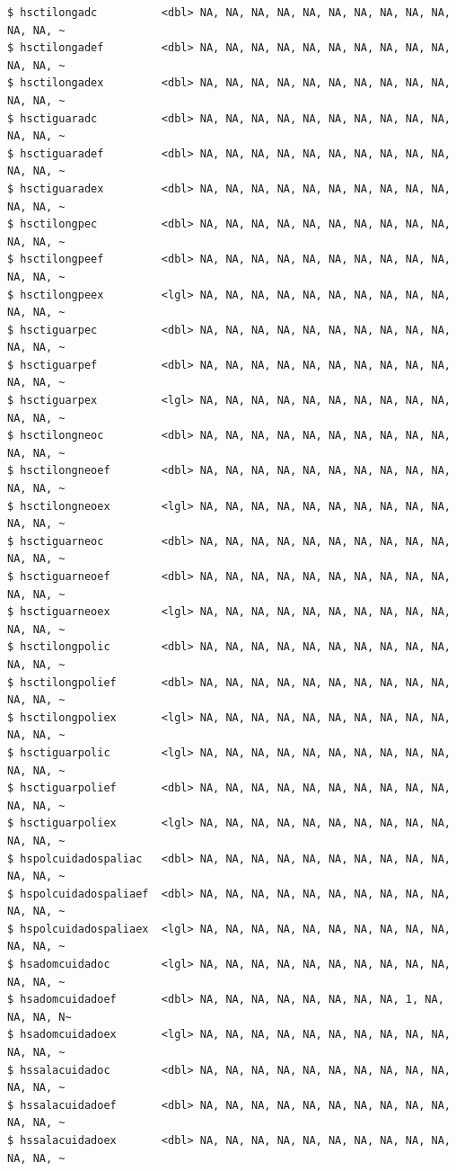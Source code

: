 \documentclass[
  letterpaper,
  DIV=11,
  numbers=noendperiod]{scrreprt}
\begin{document}
\begin{verbatim}
$ hsctilongadc          <dbl> NA, NA, NA, NA, NA, NA, NA, NA, NA, NA, NA, NA, ~
$ hsctilongadef         <dbl> NA, NA, NA, NA, NA, NA, NA, NA, NA, NA, NA, NA, ~
$ hsctilongadex         <dbl> NA, NA, NA, NA, NA, NA, NA, NA, NA, NA, NA, NA, ~
$ hsctiguaradc          <dbl> NA, NA, NA, NA, NA, NA, NA, NA, NA, NA, NA, NA, ~
$ hsctiguaradef         <dbl> NA, NA, NA, NA, NA, NA, NA, NA, NA, NA, NA, NA, ~
$ hsctiguaradex         <dbl> NA, NA, NA, NA, NA, NA, NA, NA, NA, NA, NA, NA, ~
$ hsctilongpec          <dbl> NA, NA, NA, NA, NA, NA, NA, NA, NA, NA, NA, NA, ~
$ hsctilongpeef         <dbl> NA, NA, NA, NA, NA, NA, NA, NA, NA, NA, NA, NA, ~
$ hsctilongpeex         <lgl> NA, NA, NA, NA, NA, NA, NA, NA, NA, NA, NA, NA, ~
$ hsctiguarpec          <dbl> NA, NA, NA, NA, NA, NA, NA, NA, NA, NA, NA, NA, ~
$ hsctiguarpef          <dbl> NA, NA, NA, NA, NA, NA, NA, NA, NA, NA, NA, NA, ~
$ hsctiguarpex          <lgl> NA, NA, NA, NA, NA, NA, NA, NA, NA, NA, NA, NA, ~
$ hsctilongneoc         <dbl> NA, NA, NA, NA, NA, NA, NA, NA, NA, NA, NA, NA, ~
$ hsctilongneoef        <dbl> NA, NA, NA, NA, NA, NA, NA, NA, NA, NA, NA, NA, ~
$ hsctilongneoex        <lgl> NA, NA, NA, NA, NA, NA, NA, NA, NA, NA, NA, NA, ~
$ hsctiguarneoc         <dbl> NA, NA, NA, NA, NA, NA, NA, NA, NA, NA, NA, NA, ~
$ hsctiguarneoef        <dbl> NA, NA, NA, NA, NA, NA, NA, NA, NA, NA, NA, NA, ~
$ hsctiguarneoex        <lgl> NA, NA, NA, NA, NA, NA, NA, NA, NA, NA, NA, NA, ~
$ hsctilongpolic        <dbl> NA, NA, NA, NA, NA, NA, NA, NA, NA, NA, NA, NA, ~
$ hsctilongpolief       <dbl> NA, NA, NA, NA, NA, NA, NA, NA, NA, NA, NA, NA, ~
$ hsctilongpoliex       <lgl> NA, NA, NA, NA, NA, NA, NA, NA, NA, NA, NA, NA, ~
$ hsctiguarpolic        <lgl> NA, NA, NA, NA, NA, NA, NA, NA, NA, NA, NA, NA, ~
$ hsctiguarpolief       <dbl> NA, NA, NA, NA, NA, NA, NA, NA, NA, NA, NA, NA, ~
$ hsctiguarpoliex       <lgl> NA, NA, NA, NA, NA, NA, NA, NA, NA, NA, NA, NA, ~
$ hspolcuidadospaliac   <dbl> NA, NA, NA, NA, NA, NA, NA, NA, NA, NA, NA, NA, ~
$ hspolcuidadospaliaef  <dbl> NA, NA, NA, NA, NA, NA, NA, NA, NA, NA, NA, NA, ~
$ hspolcuidadospaliaex  <lgl> NA, NA, NA, NA, NA, NA, NA, NA, NA, NA, NA, NA, ~
$ hsadomcuidadoc        <lgl> NA, NA, NA, NA, NA, NA, NA, NA, NA, NA, NA, NA, ~
$ hsadomcuidadoef       <dbl> NA, NA, NA, NA, NA, NA, NA, NA, 1, NA, NA, NA, N~
$ hsadomcuidadoex       <lgl> NA, NA, NA, NA, NA, NA, NA, NA, NA, NA, NA, NA, ~
$ hssalacuidadoc        <dbl> NA, NA, NA, NA, NA, NA, NA, NA, NA, NA, NA, NA, ~
$ hssalacuidadoef       <dbl> NA, NA, NA, NA, NA, NA, NA, NA, NA, NA, NA, NA, ~
$ hssalacuidadoex       <dbl> NA, NA, NA, NA, NA, NA, NA, NA, NA, NA, NA, NA, ~

\end{verbatim}
\end{document}

